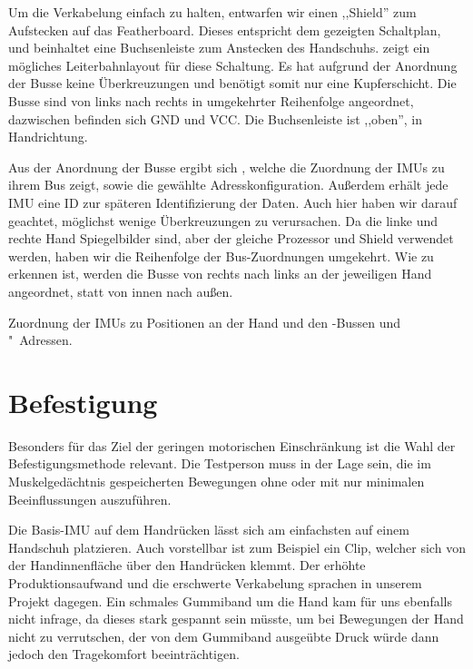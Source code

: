 Um die Verkabelung einfach zu halten, entwarfen wir einen ,,Shield'' zum
Aufstecken auf das Featherboard. Dieses entspricht dem gezeigten Schaltplan,
und beinhaltet eine Buchsenleiste zum Anstecken des Handschuhs.
 zeigt ein mögliches Leiterbahnlayout für diese Schaltung.
Es hat aufgrund der Anordnung der Busse keine Überkreuzungen und benötigt somit
nur eine Kupferschicht. Die Busse sind von links nach rechts in umgekehrter
Reihenfolge angeordnet, dazwischen befinden sich GND und VCC. Die Buchsenleiste
ist ,,oben'', in Handrichtung.

Aus der Anordnung der Busse ergibt sich , welche die Zuordnung
der IMUs zu ihrem Bus zeigt, sowie die gewählte Adresskonfiguration. Außerdem
erhält jede IMU eine ID zur späteren Identifizierung der Daten. Auch hier haben
wir darauf geachtet, möglichst wenige Überkreuzungen zu verursachen. Da die
linke und rechte Hand Spiegelbilder sind, aber der gleiche Prozessor und Shield
verwendet werden, haben wir die Reihenfolge der Bus-Zuordnungen umgekehrt. Wie
zu erkennen ist, werden die Busse von rechts nach links an der jeweiligen Hand
angeordnet, statt von innen nach außen.

\begin{table}
    \centering
    
    \caption{Zuordnung der IMUs zu Positionen an der Hand und den \iic-Bussen
    und "~Adressen.}
\end{table}

\section{Befestigung} 

Besonders für das Ziel der geringen motorischen Einschränkung ist die Wahl der
Befestigungsmethode relevant. Die Testperson muss in der Lage sein, die im
Muskelgedächtnis gespeicherten Bewegungen ohne oder mit nur minimalen
Beeinflussungen auszuführen.

Die Basis-IMU auf dem Handrücken lässt sich am einfachsten auf einem Handschuh
platzieren. Auch vorstellbar ist zum Beispiel ein Clip, welcher sich von der
Handinnenfläche über den Handrücken klemmt. Der erhöhte Produktionsaufwand und
die erschwerte Verkabelung sprachen in unserem Projekt dagegen. Ein schmales
Gummiband um die Hand kam für uns ebenfalls nicht infrage, da dieses stark
gespannt sein müsste, um bei Bewegungen der Hand nicht zu verrutschen, der von
dem Gummiband ausgeübte Druck würde dann jedoch den Tragekomfort
beeinträchtigen.

